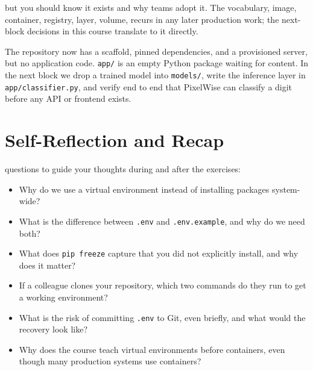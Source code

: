 
 but you should know it
exists and why teams adopt it.
The vocabulary, image, container, registry, layer, volume, recurs in any
later production work; the next-block decisions in this course translate
to it directly.




The repository now has a scaffold, pinned dependencies, and a provisioned
server, but no application code.
\texttt{app/} is an empty Python package waiting for content.
In the next block we drop a trained model into \texttt{models/}, write the
inference layer in \texttt{app/classifier.py}, and verify end to end that
PixelWise can classify a digit before any API or frontend exists.

\newpage
\section{Self-Reflection and Recap}

 questions to guide your thoughts during and after the exercises:
\begin{itemize}
    \item Why do we use a virtual environment instead of installing packages system-wide?
    \item What is the difference between \texttt{.env} and \texttt{.env.example}, and why do we need both?
    \item What does \texttt{pip freeze} capture that you did not explicitly install, and why does it matter?
    \item If a colleague clones your repository, which two commands do they run to get a working environment?
    \item What is the risk of committing \texttt{.env} to Git, even briefly, and what would the recovery look like?
    \item Why does the course teach virtual environments before containers, even though many production systems use containers?
\end{itemize}


